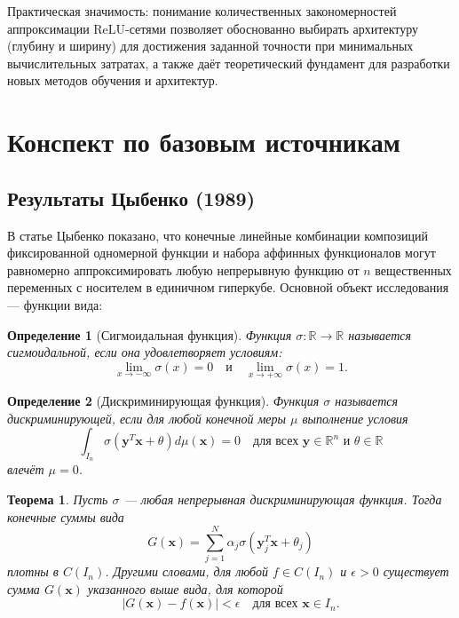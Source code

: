 \documentclass[12pt]{article}
\newtheorem{theorem}{Теорема}
\newtheorem{definition}{Определение}
\begin{document}
	Практическая значимость: понимание количественных закономерностей аппроксимации ReLU-сетями позволяет обоснованно выбирать архитектуру (глубину и ширину) для достижения заданной точности при минимальных вычислительных затратах, а также даёт теоретический фундамент для разработки новых методов обучения и архитектур.
	
	\section{Конспект по базовым источникам}
	
	\subsection{Результаты Цыбенко (1989)}
	
	В статье Цыбенко показано, что конечные линейные комбинации композиций фиксированной одномерной функции и набора аффинных функционалов могут равномерно аппроксимировать любую непрерывную функцию от $n$ вещественных переменных с носителем в единичном гиперкубе. Основной объект исследования — функции вида:
	
	\begin{definition}[Сигмоидальная функция]
		Функция $\sigma: \mathbb{R} \to \mathbb{R}$ называется сигмоидальной, если она удовлетворяет условиям:
		\[
		\lim_{x \to -\infty} \sigma(x) = 0 \quad \text{и} \quad \lim_{x \to +\infty} \sigma(x) = 1.
		\]
	\end{definition}
	
	\begin{definition}[Дискриминирующая функция]
		Функция $\sigma$ называется дискриминирующей, если для любой конечной меры $\mu$ выполнение условия
		\[
		\int_{I_n} \sigma(\mathbf{y}^T\mathbf{x} + \theta) d\mu(\mathbf{x}) = 0 \quad \text{для всех } \mathbf{y} \in \mathbb{R}^n \text{ и } \theta \in \mathbb{R}
		\]
		влечёт $\mu = 0$.
	\end{definition}
	
	\begin{theorem}
		Пусть $\sigma$ — любая непрерывная дискриминирующая функция. Тогда конечные суммы вида
		\[
		G(\mathbf{x}) = \sum_{j=1}^N \alpha_j \sigma(\mathbf{y}_j^T\mathbf{x} + \theta_j)
		\]
		плотны в $C(I_n)$. Другими словами, для любой $f \in C(I_n)$ и $\epsilon > 0$ существует сумма $G(\mathbf{x})$ указанного выше вида, для которой
		\[
		|G(\mathbf{x}) - f(\mathbf{x})| < \epsilon \quad \text{для всех } \mathbf{x} \in I_n.
		\]
	\end{theorem}
	
\end{document}
